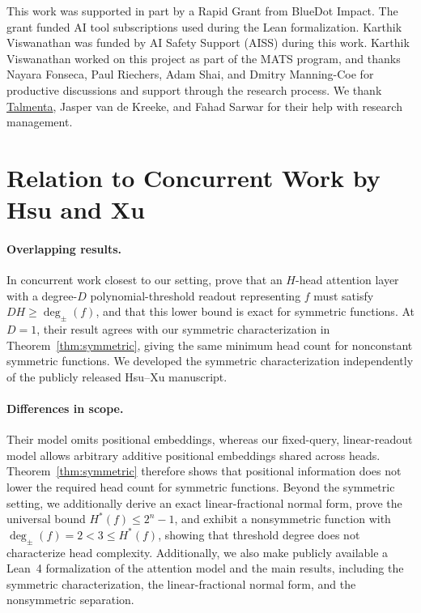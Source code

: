 \documentclass{article}
\theoremstyle{definition}
\theoremstyle{plain}
\newcommand{\hstar}{H^{\ast}}
\newcommand{\tdeg}{\deg_{\pm}}
\begin{document}
\begin{ack}
This work was supported in part by a Rapid Grant from BlueDot Impact. The grant funded AI tool subscriptions used during the Lean formalization. Karthik Viswanathan was funded by AI Safety Support (AISS) during this work. Karthik Viswanathan worked on this project as part of the MATS program, and thanks Nayara Fonseca, Paul Riechers, Adam Shai, and Dmitry Manning-Coe for productive discussions and support through the research process. We thank \href{https://talmenta.org}{Talmenta}, Jasper van de Kreeke, and Fahad Sarwar for their help with research management.
\end{ack}

\clearpage
\renewcommand{\bibsection}{\section{References}}



\clearpage
\section{Relation to Concurrent Work by Hsu and Xu}
\label{app:hsu-comparison}

\paragraph{Overlapping results.}
In concurrent work closest to our setting, \citet{hsu2026attentionbased} prove that an $H$-head attention layer with a degree-$D$ polynomial-threshold readout representing $f$ must satisfy $DH\geq\tdeg(f)$, and that this lower bound is exact for symmetric functions. At $D=1$, their result agrees with our symmetric characterization in Theorem~\ref{thm:symmetric}, giving the same minimum head count for nonconstant symmetric functions. We developed the symmetric characterization independently of the publicly released Hsu--Xu manuscript.

\paragraph{Differences in scope.}
Their model omits positional embeddings, whereas our fixed-query, linear-readout model allows arbitrary additive positional embeddings shared across heads. Theorem~\ref{thm:symmetric} therefore shows that positional information does not lower the required head count for symmetric functions. Beyond the symmetric setting, we additionally derive an exact linear-fractional normal form, prove the universal bound $\hstar(f)\leq 2^n-1$, and exhibit a nonsymmetric function with $\tdeg(f)=2<3\leq\hstar(f)$, showing that threshold degree does not characterize head complexity. Additionally, we also make publicly available a Lean~4 formalization of the attention model and the main results, including the symmetric characterization, the linear-fractional normal form, and the nonsymmetric separation.
\end{document}
